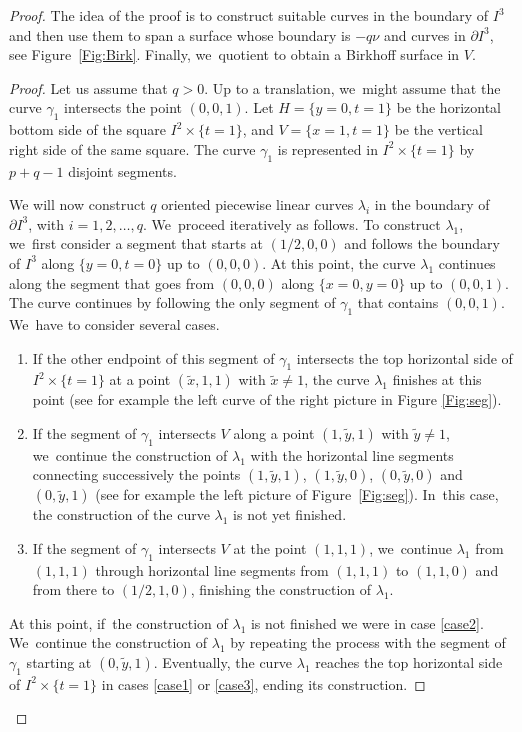 \documentclass[10pt]{amsart}
\theoremstyle{definition}
\begin{document}
\begin{proof}
The idea of the proof is to construct suitable curves in the boundary of $I^3$ and then use them to span a surface whose boundary is $-q\nu$ and curves in $\partial I^3$, see Figure~\ref{Fig:Birk}. Finally, we~quotient to obtain a Birkhoff surface in $V$.

\begin{proof}
Let us assume that $q>0$. Up to a translation, we~might assume that the curve $\gamma_1$ intersects the point $(0,0,1)$. Let $H=\{y=0, t=1\}$ be the horizontal bottom side of the square $I^2\times \{t=1\}$, and $V=\{x=1, t=1\}$ be the vertical right side of the same square. The curve $\gamma_1$ is represented in $I^2\times \{t=1\}$ by $p+q-1$ disjoint segments.

We will now construct $q$ oriented piecewise linear curves $\lambda_i$ in the boundary of $\partial I^3$, with $i=1,2,\ldots,q$. We~proceed iteratively as follows. To construct $\lambda_1$, we~first consider a segment that starts at $(1/2,0,0)$ and follows the boundary of $I^3$ along $\{y=0,t=0\}$ up to $(0,0,0)$. At this point, the curve $\lambda_1$ continues along the segment that goes from $(0,0,0)$ along $\{x=0, y=0\}$ up to $(0,0,1)$. The curve continues by following the only segment of $\gamma_1$ that contains $(0,0,1)$. We~have to consider several cases.
\begin{enumerate}
\item\label{case1} If the other endpoint of this segment of $\gamma_1$ intersects the top horizontal side of $I^2\times\{t=1\}$ at a point $(\widetilde x,1 ,1)$ with $\widetilde x\neq 1$, the curve $\lambda_1$ finishes at this point (see for example the left curve of the right picture in Figure \ref{Fig:seg}).
\item\label{case2} If the segment of $\gamma_1$ intersects $V$ along a point $(1, \widetilde y, 1)$ with $\widetilde y\neq 1$, we~continue the construction of $\lambda_1$ with the horizontal line segments connecting successively the points $(1,\widetilde y, 1)$, $(1,\widetilde y, 0)$, $(0,\widetilde y,0)$ and $(0,\widetilde y, 1)$ (see for example the left picture of Figure~\ref{Fig:seg}). In~this case, the construction of the curve $\lambda_1$ is not yet finished.
\item\label{case3} If the segment of $\gamma_1$ intersects $V$ at the point $(1, 1, 1)$, we~continue $\lambda_1$ from $(1,1,1)$ through horizontal line segments from $(1,1,1)$ to $(1,1,0)$ and from there to $(1/2,1,0)$, finishing the construction of $\lambda_1$.
\end{enumerate}
At this point, if~the construction of $\lambda_1$ is not finished we were in case \eqref{case2}. We~continue the construction of $\lambda_1$ by repeating the process with the segment of $\gamma_1$ starting at $(0,\widetilde y,1)$. Eventually, the curve $\lambda_1$ reaches the top horizontal side of $I^2\times\{t=1\}$ in cases \eqref{case1} or \eqref{case3}, ending its construction.


\end{proof}
\end{proof}
\end{document}
